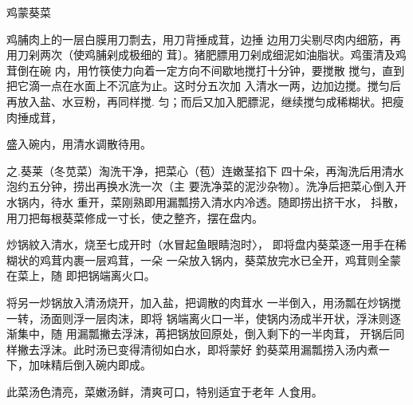 \begin{recipe}{鸡蒙葵菜}

\ingredients


\cooking

\step 鸡脯肉上的一层白膜用刀剽去，用刀背捶成茸，边捶 边用刀尖剔尽肉内细筋，再用刀剁两次（使鸡脯剁成极细的 茸〕。猪肥膘用刀剁成细泥如油脂状。鸡蛋清及鸡茸倒在碗 内，用竹筷使力向着一定方向不间歇地搅打十分钟，要搅散 搅勻，直到把它滴一点在水面上不沉底为止。这时分五次加 入清水一两，边加边搅。搅匀后再放入盐、水豆粉，再同样搅. 匀；而后又加入肥膘泥，继续搅匀成稀糊状。把瘦肉捶成茸，

盛入碗内，用清水调散待用。

之.葵莱（冬苋菜）淘洗干净，把菜心（苞）连嫩茎掐下 四十朵，再淘洗后用清水泡约五分钟，捞出再换水洗一次（主 要洗净菜的泥沙杂物〕。洗净后把菜心倒入开水锅内，待水 重开，菜刚熟即用漏瓢捞入清水内冷透。随即捞出挤干水， 抖散，用刀把每根葵菜修成一寸长，使之整齐，摆在盘内。

炒锅紋入清水，烧至七成开时（水冒起鱼眼睛泡时〉， 即将盘内葵菜逐一用手在稀糊状的鸡茸内裹一层鸡茸，一朵 一朵放入锅内，葵菜放完水已全开，鸡茸则全蒙在菜上，随 即把锅端离火口。

将另一炒锅放入清汤烧开，加入盐，把调散的肉茸水 一半倒入，用汤瓢在炒锅搅一转，汤面则浮一层肉沫，即将 锅端离火口一半，使锅内汤成半开状，浮沬则逐渐集中，随 用漏瓢撇去浮沫，苒把锅放回原处，倒入剩下的一半肉茸， 开锅后同样撇去浮沫。此时汤已变得清彻如白水，即将蒙好 釣葵菜用漏瓢捞入汤内煮一下，加味精后倒入碗内即成。

\notes

此菜汤色清亮，菜嫩汤鲜，清爽可口，特别适宜于老年 人食用。

\end{recipe}

